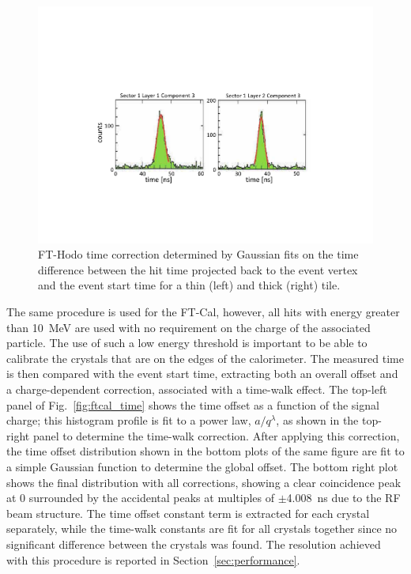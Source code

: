 \begin{figure}
\includegraphics[width=1.0\columnwidth]{fig/fthodo_time.pdf}
\caption{FT-Hodo time correction determined by Gaussian fits on the time difference between the hit time
  projected back to the event vertex and the event start time for a thin (left) and thick (right) tile.}
\label{fig:fthodo_time}
\end{figure}

The same procedure is used for the FT-Cal, however, all hits with energy greater than 10~MeV are used
with no requirement on the charge of the associated particle. The use of such a low energy threshold is important
to be able to calibrate the crystals that are on the edges of the calorimeter. The measured time is then compared
with the event start time, extracting both an overall offset and a charge-dependent correction, associated with a
time-walk effect. The top-left panel of Fig.~\ref{fig:ftcal_time} shows the time offset as  a function of the
signal charge; this histogram profile is fit to a power law, $a/q^\lambda$, as shown in the top-right panel to
determine the time-walk correction. After applying this correction, the time offset distribution shown in the bottom
plots  of the same figure are fit to a simple Gaussian function to determine the global offset. The bottom right
plot shows the final distribution with all corrections, showing a clear  coincidence peak at 0 surrounded by the
accidental peaks at multiples of $\pm$4.008~ns  due to the RF beam structure. The time offset constant term is
extracted for each crystal separately, while the time-walk constants are fit for all crystals together since no
significant difference between the crystals was found. The resolution achieved with this procedure is reported in
Section~\ref{sec:performance}.

